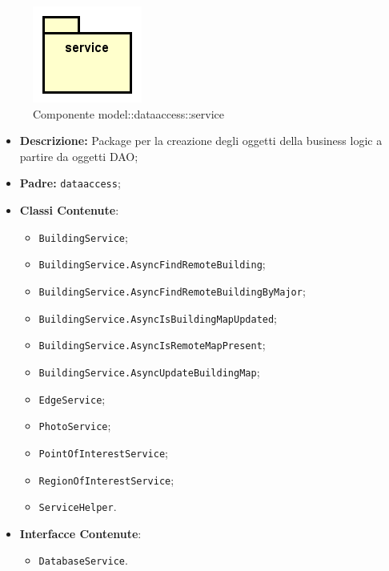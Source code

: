 \documentclass[../DefinizioneDiProdotto.tex]{subfiles}
\begin{document}
\begin{figure}[H]
	\centering
	\includegraphics[width=\maxwidth]{img/package/service.png}
	\caption{Componente model::\-dataaccess::\-service}\label{fig:model::dataaccess::service} 
\end{figure}
\begin{itemize}
	\item \textbf{Descrizione:} Package per la creazione degli oggetti della business logic a partire da oggetti DAO;
	\item \textbf{Padre:} \texttt{dataaccess};
	\item \textbf{Classi Contenute}:
	\begin{itemize}
		\item \texttt{BuildingService};
		
		\item \texttt{BuildingService.AsyncFindRemoteBuilding};
		
		\item \texttt{BuildingService.AsyncFindRemoteBuildingByMajor};
		
		\item \texttt{BuildingService.AsyncIsBuildingMapUpdated};
		
		\item \texttt{BuildingService.AsyncIsRemoteMapPresent};
		
		\item \texttt{BuildingService.AsyncUpdateBuildingMap};
		
		\item \texttt{EdgeService};
		
		\item \texttt{PhotoService};
		
		\item \texttt{PointOfInterestService};
		
		\item \texttt{RegionOfInterestService};
		
		\item \texttt{ServiceHelper}.
		
	\end{itemize}
	\item \textbf{Interfacce Contenute}:
	\begin{itemize}
		\item \texttt{DatabaseService}.
		
	\end{itemize}
\end{itemize}
\end{document}
